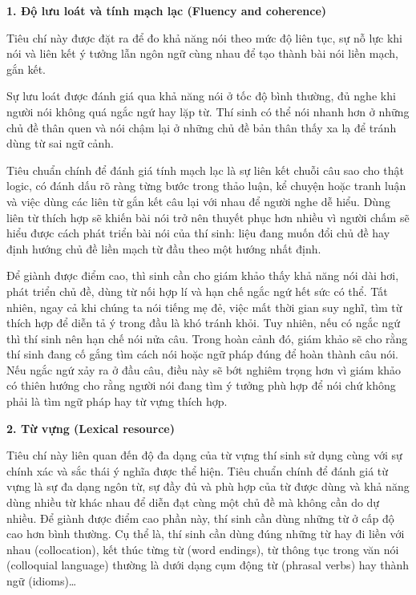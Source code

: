 \textbf{1. Độ lưu loát và tính mạch lạc (Fluency and coherence)}  

\vspace{.25cm}
Tiêu chí này được đặt ra để đo khả năng nói theo mức độ liên tục, sự nỗ lực khi nói và liên kết ý tưởng lẫn ngôn ngữ cùng nhau để tạo thành bài nói liền mạch, gắn kết.  

\vspace{.25cm}
Sự lưu loát được đánh giá qua khả năng nói ở tốc độ bình thường, đủ nghe khi người nói không quá ngắc ngứ hay lặp từ. Thí sinh có thể nói nhanh hơn ở những chủ đề thân quen và nói chậm lại ở những chủ đề bản thân thấy xa lạ để tránh dùng từ sai ngữ cảnh. 

\vspace{.25cm}
Tiêu chuẩn chính để đánh giá tính mạch lạc là sự liên kết chuỗi câu sao cho thật logic, có đánh dấu rõ ràng từng bước trong thảo luận, kể chuyện hoặc tranh luận và việc dùng các liên từ gắn kết câu lại với nhau để người nghe dễ hiểu. Dùng liên từ thích hợp sẽ khiến bài nói trở nên thuyết phục hơn nhiều vì người chấm sẽ hiểu được cách phát triển bài nói của thí sinh: liệu đang muốn đổi chủ đề hay định hướng chủ đề liền mạch từ đầu theo một hướng nhất định.  

\vspace{.25cm}
Để giành được điểm cao, thì sinh cần cho giám khảo thấy khả năng nói dài hơi, phát triển chủ đề, dùng từ nối hợp lí và hạn chế ngắc ngứ hết sức có thể. Tất nhiên, ngay cả khi chúng ta nói tiếng mẹ đẻ, việc mất thời gian suy nghĩ, tìm từ thích hợp để diễn tả ý trong đầu là khó tránh khỏi. Tuy nhiên, nếu có ngắc ngứ thì thí sinh nên hạn chế nói nửa câu. Trong hoàn cảnh đó, giám khảo sẽ cho rằng thí sinh đang cố gắng tìm cách nói hoặc ngữ pháp đúng để hoàn thành câu nói. Nếu ngắc ngứ xảy ra ở đầu câu, điều này sẽ bớt nghiêm trọng hơn vì giám khảo có thiên hướng cho rằng người nói đang tìm ý tưởng phù hợp để nói chứ không phải là tìm ngữ pháp hay từ vựng thích hợp. 

\vspace{.25cm}
\textbf{2. Từ vựng (Lexical resource)}  

\vspace{.25cm}
Tiêu chí này liên quan đến độ đa dạng của từ vựng thí sinh sử dụng cùng với sự chính xác và sắc thái ý nghĩa được thể hiện. Tiêu chuẩn chính để đánh giá từ vựng là sự đa dạng ngôn từ, sự đầy đủ và phù hợp của từ được dùng và khả năng dùng nhiều từ khác nhau để diễn đạt cùng một chủ đề mà không cần do dự nhiều. Để giành được điểm cao phần này, thí sinh cần dùng những từ ở cấp độ cao hơn bình thường. Cụ thể là, thí sinh cần dùng đúng những từ hay đi liền với nhau (collocation), kết thúc từng từ (word endings), từ thông tục trong văn nói (colloquial language) thường là dưới dạng cụm động từ (phrasal verbs) hay thành ngữ (idioms)…  

